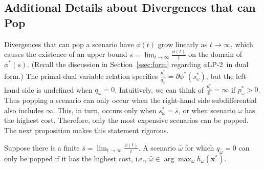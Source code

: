 \documentclass[opre,nonblindrev]{informs3} %
\newcommand{\x}{\mathbf{x}}
\newcommand{\plp}{$\phi$LP-2}
\begin{document}

\subsection{Additional Details about Divergences that can Pop}
\label{ssec:pop}

Divergences that can pop a scenario have $\phi(t)$ grow linearly as $t \rightarrow \infty$, which causes the existence of an upper bound $\bar{s} = \lim_{t \rightarrow \infty} \frac{\phi(t)}{t}$ on the domain of $\phi^*(s)$.
(Recall the discussion in Section~\ref{ssec:form} regarding \plp\ in dual form.)
The primal-dual variable relation specifies $\frac{p^*_\omega}{q_\omega} = \partial \phi^*(s^*_\omega)$, but the left-hand side is undefined when $q_\omega = 0$.
Intuitively, we can think of $\frac{p^*_\omega}{0} = \infty$ if $p^*_\omega > 0$. 
Thus popping a scenario can only occur when the right-hand side subdifferential also includes $\infty$.
This, in turn, occurs only when $s^*_\omega = \bar{s}$, or when scenario $\omega$ has the highest cost.
Therefore, only the most expensive scenarios can be popped. 
The next proposition makes this statement rigorous.

\begin{proposition} \label{prop:pop}
	Suppose there is a finite $\bar{s} = \lim_{t \rightarrow \infty} \frac{\phi(t)}{t}$.
	A scenario $\bar{\omega}$ for which $q_{\bar{\omega}} = 0$ can only be popped if 
it has the highest cost, i.e.,  $\bar{\omega} \in \arg\max_{\omega} h_\omega(\x^*)$. 
\end{proposition}
\end{document}
